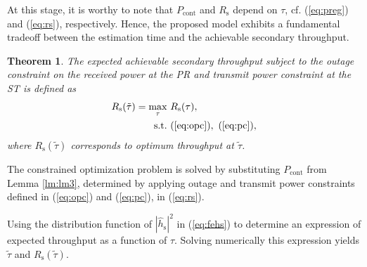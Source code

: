 \documentclass[letterpaper, twocolumn]{IEEEtran}
\newcommand{\e}[2]{{\mathbb E}_{#1}\left[ #2 \right]}
\newcommand{\p}{\mathbb P}
\newcommand{\sub}[1]{_{\text{#1}}}
\newcommand{\opc}{\rho\sub{out}}
\newcommand{\pc}{\rho\sub{cont}}
\newcommand{\preg}{P\sub{cont}}
\newcommand{\eprcvd}{\hat{P}\sub{rcvd}}
\newcommand{\ptran}{P\sub{tran}}
\newcommand{\pp}{P\sub{p}}
\newcommand{\ite}{\theta\sub{I}}
\newcommand{\rs}{R\sub{s}}
\newcommand{\trs}{R\sub{s}}
\newcommand{\ers}{\e{}{\rs}}
\newcommand{\gp}{h\sub{p}}
\newcommand{\epgs}{|\hat{h}\sub{s}|^2}
\newcommand{\gs}{h\sub{s}}
\newcommand{\nps}{\sigma^2}
\newcommand{\ttau}{\tilde{\tau}}
\newcommand{\drs}{f_{\rs}}
\DeclareMathOperator*{\maxi}{max}
\newtheorem{theorem}{Theorem}
\begin{document}
At this stage, it is worthy to note that $\preg$ and $\trs$ depend on $\tau$, cf. (\ref{eq:preg}) and (\ref{eq:rs}), respectively. Hence, the proposed model exhibits a fundamental tradeoff between the estimation time and the achievable secondary throughput.  
\begin{theorem} \label{th:th1}
\normalfont
The expected achievable secondary throughput subject to the outage constraint on the received power at the PR and transmit power constraint at the ST is defined as
\begin{align}
\trs(\ttau) = \maxi_{\tau}  & \text{      } {\rs(\tau)}, 
 \label{eq:sys} \\
\text{s.t.} & \text{ } (\ref{eq:opc}), \text{  } (\ref{eq:pc}), \nonumber 
 \end{align}
where $\trs(\ttau)$ corresponds to optimum throughput at $\ttau$.  
\end{theorem}
\begin{IEEEproof}
The constrained optimization problem is solved by substituting $\preg$ from Lemma \ref{lm:lm3}, determined by applying outage and transmit power constraints defined in (\ref{eq:opc}) and (\ref{eq:pc}), in (\ref{eq:rs}). 

Using the distribution function of $\epgs$ in (\ref{eq:fehs}) to determine an expression of expected throughput as a function of $\tau$. Solving numerically this expression yields $\ttau$ and $\trs(\ttau)$. 
\end{IEEEproof}

\end{document}
